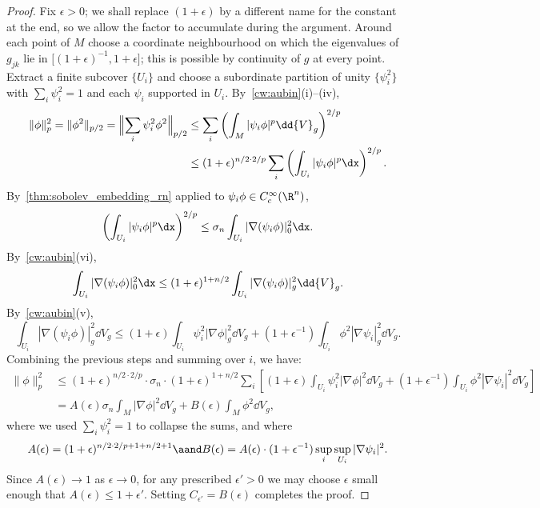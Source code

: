 \begin{proof}
  Fix $\epsilon > 0$; we shall replace $(1+\epsilon)$ by a different name for the constant at the end, so we allow the factor to accumulate during the argument. Around each point of $M$ choose a coordinate neighbourhood on which the eigenvalues of $g_{jk}$ lie in $\bigl[(1+\epsilon)^{-1}, 1+\epsilon\bigr]$; this is possible by continuity of $g$ at every point. Extract a finite subcover $\{U_i\}$ and choose a subordinate partition of unity $\{\psi_i^2\}$ with $\sum_i \psi_i^2 = 1$ and each $\psi_i$ supported in $U_i$. By~\cref{cw:aubin}(i)--(iv),
  \begin{align*}
    \|\phi\|_p^2 = \|\phi^2\|_{p/2} = \Bigl\lVert\sum_i \psi_i^2\phi^2\Bigr\rVert_{p/2} &\le \sum_i \left(\int_M |\psi_i\phi|^p\dd{V}_g\right)^{2/p} \\
                                                                                        &\le (1+\epsilon)^{n/2 \cdot 2/p} \sum_i \left(\int_{U_i} |\psi_i\phi|^p\dx\right)^{2/p}
  .\end{align*}
  By~\cref{thm:sobolev_embedding_rn} applied to $\psi_i\phi \in C^\infty_c(\R^n)$,
  \[%
    \left(\int_{U_i} |\psi_i\phi|^p\dx\right)^{2/p} \le \sigma_n \int_{U_i} |\nabla(\psi_i\phi)|^2_0 \dx
  .\]%
  By~\cref{cw:aubin}(vi),
  \[%
    \int_{U_i} |\nabla(\psi_i\phi)|^2_0 \dx \le (1+\epsilon)^{1+n/2} \int_{U_i} |\nabla(\psi_i\phi)|^2_g \dd{V}_g
  .\]%
  By~\cref{cw:aubin}(v),
  \[%
    \int_{U_i} |\nabla(\psi_i\phi)|^2_g \dd{V}_g \le (1+\epsilon)\int_{U_i} \psi_i^2|\nabla\phi|^2_g \dd{V}_g + (1+\epsilon^{-1})\int_{U_i} \phi^2|\nabla\psi_i|^2_g \dd{V}_g
  .\]%
  Combining the previous steps and summing over $i$, we have:
  \begin{align*}
    \|\phi\|_p^2 &\le (1+\epsilon)^{n/2 \cdot 2/p} \cdot \sigma_n \cdot (1+\epsilon)^{1+n/2} \sum_i \left[(1+\epsilon)\int_{U_i}\psi_i^2|\nabla\phi|^2\dd{V}_g + (1+\epsilon^{-1})\int_{U_i}\phi^2|\nabla\psi_i|^2\dd{V}_g\right] \\
                  &= A(\epsilon) \sigma_n \int_M |\nabla\phi|^2\dd{V}_g + B(\epsilon)\int_M \phi^2\dd{V}_g
  ,\end{align*}
  where we used $\sum_i \psi_i^2 = 1$ to collapse the sums, and where
  \[%
    A(\epsilon) = (1+\epsilon)^{n/2 \cdot 2/p + 1 + n/2 + 1} \aand B(\epsilon) = A(\epsilon)\cdot(1+\epsilon^{-1})\sup_i\sup_{U_i}|\nabla\psi_i|^2
  .\]%
  Since $A(\epsilon) \to 1$ as $\epsilon \to 0$, for any prescribed $\epsilon' > 0$ we may choose $\epsilon$ small enough that $A(\epsilon) \le 1 + \epsilon'$. Setting $C_{\epsilon'} = B(\epsilon)$ completes the proof.
\end{proof}

